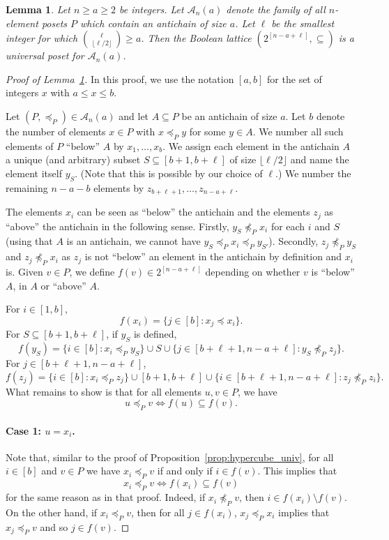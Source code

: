\documentclass[10pt,a4paper]{amsart}
\newtheorem{lemma}{Lemma}
\def\cleq{\preccurlyeq}
\begin{document}
\begin{lemma}
\label{lem:hypercube_antichain}
    Let $n\geq a\geq 2$ be integers. Let $\mathcal{A}_n(a)$ denote the family of all $n$-element posets $P$ which contain an antichain of size $a$. Let $\ell$ be the smallest integer for which $\binom{\ell}{\lfloor\ell/2\rfloor}\geq a$. 
    Then the Boolean lattice $(2^{[n-a+\ell]},\subseteq)$ is a universal poset for $\mathcal{A}_n(a)$. 
\end{lemma}

\begin{proof}[Proof of Lemma~\ref{lem:hypercube_antichain}]
In this proof, we use the notation $[a,b]$ for the set of integers $x$ with $a\leq x\leq b$.

    Let $(P,\cleq_P) \in \mathcal{A}_n(a)$ and let $A \subseteq P$ be an antichain of size $a$. Let $b$ denote the number of elements $x\in P$ with $x\cleq_P y$ for some $y\in A$. We number all such elements of $P$ ``below'' $A$ by $x_1,\dots,x_b$. We assign each element in the antichain $A$ a unique (and arbitrary) subset $S\subseteq [b+1,b+\ell]$ of size $\lfloor \ell/2 \rfloor$ and name the element itself $y_S$. (Note that this is possible by our choice of $\ell$.) We number the remaining $n-a-b$ elements by $z_{b+\ell+1},\dots,z_{n-a+\ell}$.  

    The elements $x_i$ can be seen as ``below'' the antichain and the elements $z_j$ as ``above'' the antichain in the following sense. Firstly, $y_S\not\cleq_P x_i$ for each $i$ and $S$ (using that $A$ is an antichain, we cannot have $y_{S}\cleq_P x_i\cleq_P y_{S'}$). Secondly, $z_j\not\cleq_P y_S$ and $z_j\not\cleq_P x_i$ as $z_j$ is not ``below'' an element in the antichain by definition and $x_i$ is. 
    Given $v \in P$, we define $f(v)\in 2^{[n-a+\ell]}$ depending on whether $v$ is ``below'' $A$, in $A$ or ``above'' $A$.

    For $i\in [1,b]$, 
    \[
    f(x_i)=\{j\in [b]:x_j\preceq x_i\}.
    \]
For $S\subseteq [b+1,b+\ell]$, if $y_S$ is defined, \[
f(y_S)=\{i\in [b]:x_i\cleq_P y_S\}\cup S\cup  \{j\in [b+\ell+1,n-a+\ell]:y_S\not \cleq_P z_j\}.
\]
For $j\in [b+\ell+1,n-a+\ell]$,  \[
f(z_j)=\{i\in [b]:x_i\cleq_P z_j\} \cup [b+1,b+\ell]
\cup 
\{i\in [b+\ell+1,n-a+\ell]:z_j \not \cleq_P z_i\}. 
\]
What remains to show is that for all elements $u,v\in P$, we have
\begin{equation}
    \label{eq:poset_contains}
u\cleq_P v \iff f(u)\subseteq f(v).
\end{equation}

\paragraph{Case 1: $u = x_i$.} Note that, similar to the proof of  Proposition~\ref{prop:hypercube_univ}, for all $i\in [b]$ and $v\in P$ we have $x_i\cleq_P v$ if and only if $i\in f(v)$. This implies that
\[
x_i\cleq_P v \iff f(x_i)\subseteq f(v)
\]
for the same reason as in that proof.
Indeed, if  $x_i\not\cleq_Pv$, then $i\in f(x_i)\setminus f(v)$. On the other hand, if $x_i\cleq_P v$, then for all $j\in f(x_i)$, $x_j\cleq_P x_i$ implies that $x_j\cleq_Pv$  and so $j\in f(v)$. 


\end{proof}
\end{document}
